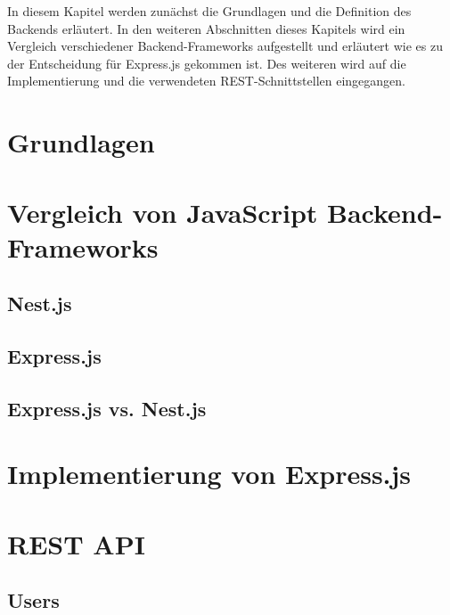 In diesem Kapitel werden zunächst die Grundlagen und die Definition des Backends erläutert. In den weiteren Abschnitten dieses Kapitels wird ein Vergleich verschiedener Backend-Frameworks aufgestellt und erläutert wie es zu der Entscheidung für Express.js gekommen ist. Des weiteren wird auf die Implementierung und die verwendeten REST-Schnittstellen eingegangen.

\section{Grundlagen}


\section{Vergleich von JavaScript Backend-Frameworks}


\subsection{Nest.js}


\subsection{Express.js}


\subsection{Express.js vs. Nest.js}


\section{Implementierung von Express.js}


\section{REST API}


\subsection{Users}


